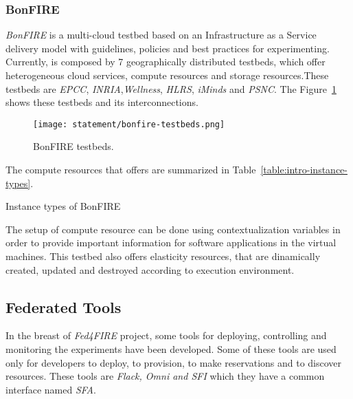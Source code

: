 \subsubsection{BonFIRE}

\emph{BonFIRE} is a multi-cloud testbed based on an Infrastructure as a Service
delivery model with guidelines, policies and best practices for
experimenting. Currently, \bonfire is composed by 7 geographically distributed
testbeds, which offer heterogeneous cloud services, compute resources and
storage resources.These testbeds are \emph{EPCC},\emph{ INRIA},\emph{Wellness},\emph{ HLRS}, \emph{iMinds} and \emph{PSNC}. The Figure~\ref{fig:intr-bonfire-testbeds} shows these testbeds and its interconnections.

\begin{figure}[!h]
\begin{center}
\texttt{[image: statement/bonfire-testbeds.png]}
\caption{BonFIRE testbeds.}
\label{fig:intr-bonfire-testbeds}
\end{center}
\end{figure}

The compute resources that \bonfire offers are summarized in Table~\ref{table:intro-instance-types}.

\begin{table}[hp]
  \centering
  {\small
  
  }
  \caption{Instance types of BonFIRE}
  \label{table:intro-instance-types}
\end{table}

The setup of compute resource can be done using contextualization variables in
order to provide important information for software applications in the virtual
machines. 
This testbed also offers elasticity resources, that are dinamically created,
updated and destroyed according to execution environment.


\subsection{Federated Tools}

In the breast of \emph{Fed4FIRE} project, some tools for deploying, controlling and
monitoring the experiments have been developed. 
Some of these tools are used only for developers to deploy, to provision, to
make reservations and to discover resources. These tools are \emph{Flack, Omni
  and SFI} which they have a common interface named \emph{SFA}.

